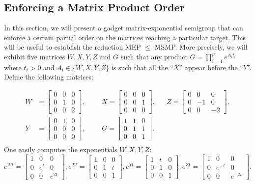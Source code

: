 \documentclass[format=acmsmall, review=false, screen=true]{acmart}
\begin{document}
\subsection{Enforcing a Matrix Product Order}
\label{sec:lics_gadget}

In this section, we will present a gadget matrix-exponential semigroup that can
enforce a certain partial order on the matrices reaching a particular target.
This will be useful to establish the reduction MEP $\leq$ MSMP\@.
More precisely, we will exhibit five matrices $W,X,Y,Z$ and $G$ such that any
product $G=\prod_{i=1}^{p} e^{A_{i} t_{i}}$
where $t_{i}>0$ and $A_{i}\in \lbrace W,X,Y,Z \rbrace$ is such that all the ``$X$'' appear before
the ``$Y$''. Define the following matrices:

\begin{align*}
W&=\begin{bmatrix}0&0&0\\0&1&0\\0&0&2\end{bmatrix},&&
&X=\begin{bmatrix}0&0&0\\0&0&1\\0&0&0\end{bmatrix},&&
Z=\begin{bmatrix}0&0&0\\0&-1&0\\0&0&-2\end{bmatrix},\\[5pt]
Y&=\begin{bmatrix}0&1&0\\0&0&0\\0&0&0\end{bmatrix},&&
&G=\begin{bmatrix}1&1&0\\0&1&1\\0&0&1\end{bmatrix}.\\
\end{align*}
One easily computes the exponentials $W,X,Y,Z$:
\[
e^{Wt}=\begin{bmatrix}1&0&0\\0&e^t&0\\0&0&e^{2t}\end{bmatrix},
e^{Xt}=\begin{bmatrix}1&0&0\\0&1&t\\0&0&1\end{bmatrix},
e^{Yt}=\begin{bmatrix}1&t&0\\0&1&0\\0&0&1\end{bmatrix},
e^{Zt}=\begin{bmatrix}1&0&0\\0&e^{-t}&0\\0&0&e^{-2t}\end{bmatrix}.
\]
\end{document}
